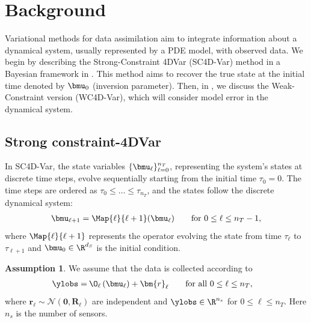 \documentclass{aims} %
\theoremstyle{definition}
\newtheorem{assumption}{Assumption}
\begin{document}
\section{Background}\label{section:background}


Variational methods for data assimilation aim to integrate information about a dynamical system, usually represented by a PDE model, with observed data. 
We begin by describing the Strong-Constraint 4DVar (SC4D-Var) method in a Bayesian framework in . 
This method aims to recover the true state at the initial time denoted by $\bmu_0$ (inversion parameter). 
Then, in , we discuss the Weak-Constraint version (WC4D-Var), which will consider model error in the dynamical system.


\subsection{Strong constraint-4DVar}\label{ssec:sc4d-var}
In SC4D-Var, the state variables $\{\bmu_{\ell}\}_{\ell = 0}^{n_T}$, representing the system's states at discrete time steps, evolve sequentially starting from the initial time $\tau_0=0$. The time steps are ordered as  $\tau_0 \le \dots \le \tau_{n_T}$, and the states follow the discrete dynamical system:
%
\begin{align}
    \bmu_{\ell + 1} = \Map{\ell}{{\ell + 1}} (\bmu_\ell) \qquad  \mbox{for } 0 \leq \ell \leq n_T-1,
\end{align}
where $\Map{\ell}{{\ell + 1}}$ represents the operator evolving the state from time $\tau_\ell$ to $\tau_{\ell+1}$ and $\bmu_0\in \R^{d_S}$ is the initial condition. 
\begin{assumption}
\label{assumption:data}    
We assume that the data is collected according to 
\begin{align}
    \ylobs = & \> \O_{\ell }\left(\bmu_{\ell}\right) + \bm{r}_{\ell}  \qquad  \mbox{for all } 0 \leq \ell \leq n_T,
\end{align}
where $\bm r_{\ell} 
\sim \mathcal{N}(\bm 0, {\bm R_\ell})$ are independent and $\ylobs \in \R^{n_s}$ for $0\le \ell \le n_T$. Here $n_s$ is the number of sensors.
\end{assumption}
\end{document}

